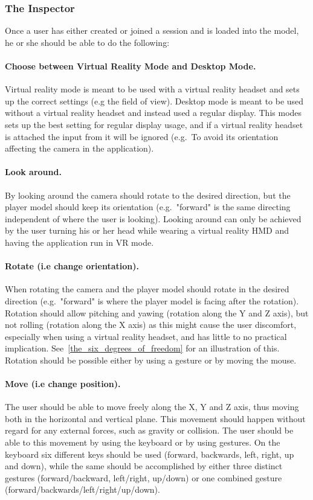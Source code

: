
\subsubsection{The Inspector}
Once a user has either created or joined a session and is loaded into the model, he or she should be able to do the following:

\paragraph{Choose between Virtual Reality Mode and Desktop Mode.} Virtual reality mode is meant to be used with a virtual reality headset
and sets up the correct settings (e.g the field of view). Desktop mode is meant to be used without a virtual reality headset and instead used
a regular display. This modes sets up the best setting for regular display usage, and if a virtual reality headset is attached the input from it will be ignored 
(e.g.~To avoid its orientation affecting the camera in the application).

\paragraph{Look around.} By looking around the camera should rotate to the desired direction, but the player model should keep its orientation 
(e.g.~"forward" is the same directing independent of where the user is looking). Looking around can only be achieved by the user turning his or her 
head while wearing a virtual reality HMD and having the application run in VR mode.

\paragraph{Rotate (i.e change orientation).} When rotating the camera and the player model should rotate in the desired direction (e.g.~"forward" is where the player model is
facing after the rotation).
Rotation should allow pitching and yawing (rotation along the Y and Z axis), but not rolling (rotation along the X axis) as this might cause the user discomfort, especially when
using a virtual reality headset, and has little to no practical implication. See~\vref{the_six_degrees_of_freedom} for an illustration of this. 
Rotation should be possible either by using a gesture or by moving the mouse.

\paragraph{Move (i.e change position).} The user should be able to move freely along the X, Y and Z axis, thus moving both in the horizontal and vertical plane. 
This movement should happen without regard for any external forces, such as gravity or collision. The user should be able to this movement by using the keyboard or 
by using gestures. On the keyboard six different keys should be used (forward, backwards, left, right, up and down), while the same should be accomplished by
either three distinct gestures (forward/backward, left/right, up/down) or one combined gesture (forward/backwards/left/right/up/down).

